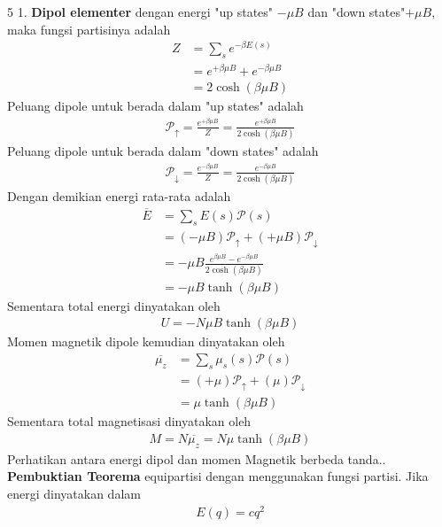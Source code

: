 \documentclass[a4paper  , 6 pt]{article}
\begin{document}
\begin{tiny}
\begin{multicols} {5}
1. \textbf{ Dipol elementer} dengan energi "up states" $-\mu B$ dan "down states"$+\mu B$, maka fungsi partisinya adalah
\newcommand{\pindah}{\nonumber \\}
\newcommand{\sama}{& =}
\begin{align}
Z &= \sum_s e^{-\beta E(s)} \pindah 
\sama e^{+ \beta \mu B} +  e^{-\beta \mu B} \pindah 
\sama 2 \cosh (\beta \mu B)
\end{align}
Peluang dipole untuk berada dalam "up states" adalah
\begin{align}
\mathcal{P}_\uparrow = \frac{e^{+\beta \mu B}}{Z} = \frac{e^{+ \beta \mu B}}{2 \cosh (\beta \mu B)}
\end{align}
Peluang dipole untuk berada dalam "down states" adalah
\begin{align}
\mathcal{P}_\downarrow = \frac{e^{-\beta \mu B}}{Z} =  \frac{e^{- \beta \mu B}}{2 \cosh (\beta \mu B)}
\end{align}
Dengan demikian energi rata-rata adalah
\begin{align}
\overline{E}& = \sum_s E(s) \mathcal{P}(s) \nonumber \\ 
& = (- \mu B )\mathcal{P}_\uparrow + (+ \mu B)\mathcal{P}_\downarrow  \nonumber \\
& = - \mu B \frac{e^{\beta \mu B} - e^{- \beta \mu B}}{2 \cosh (\beta \mu B)}  \nonumber \\
& = - \mu B \tanh (\beta \mu B) 
\end{align}
Sementara total energi dinyatakan oleh
\begin{align}
U = - N \mu B \tanh(\beta \mu B)
\end{align}
Momen magnetik dipole kemudian dinyatakan oleh
\begin{align}
\overline{\mu_z } &= \sum_s \mu_s (s) \mathcal{P}(s)  \nonumber \\
& = (+ \mu ) \mathcal{P}_\uparrow + (\mu ) \mathcal{P}_\downarrow \nonumber \\
& = \mu \tanh(\beta \mu B) 
\end{align}
Sementara total magnetisasi dinyatakan oleh 
\begin{align}
M = N \overline{\mu_z} = N \mu \tanh (\beta \mu B)
\end{align}
Perhatikan antara energi dipol dan momen Magnetik berbeda tanda.. \textbf{Pembuktian Teorema} equipartisi dengan menggunakan fungsi partisi. Jika energi dinyatakan dalam 
\begin{align}
E(q) = c q^2 
\end{align}

\end{multicols}
\end{tiny}
\end{document}
